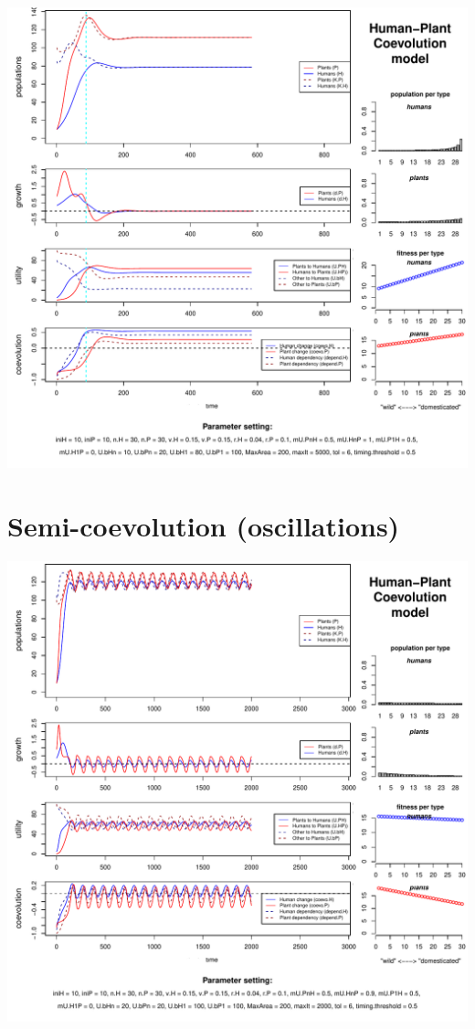 \documentclass[]{book}
\begin{document}
\includegraphics{hpcModel-exploration_files/figure-latex/1_run.semicoevo-plot-1.pdf}

\newpage

\hypertarget{semi-coevolution-oscillations}{%
\section{Semi-coevolution (oscillations)}\label{semi-coevolution-oscillations}}

\includegraphics{hpcModel-exploration_files/figure-latex/1_run.semicoevo.osc1-plot-1.pdf}
\end{document}
